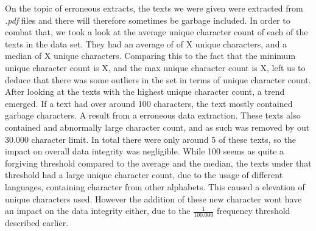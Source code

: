 On the topic of erroneous extracts, the texts we were given were extracted from
\textit{.pdf} files and there will therefore sometimes be garbage included.
In order to combat that, we took a look at the average unique character count
of each of the texts in the data set. They had an average of of X unique
characters, and a median of X unique characters. Comparing this to the fact that
the minimum unique character count is X, and the max unique character count is
X, left us to deduce that there was some outliers in the set in terms of unique
character count. After looking at the texts with the highest unique character
count, a trend emerged. If a text had over around 100 characters, the text
mostly contained garbage characters. A result from a erroneous data extraction.
These texts also contained and abnormally large character count, and as such
was removed by out 30.000 character limit. In total there were only around 5 of
these texts, so the impact on overall data integrity was negligible. While 100
seems as quite a forgiving threshold compared to the average and the median, the
texts under that threshold had a large unique character count, due to the usage
of different languages, containing character from other alphabets. This caused a
elevation of unique characters used. However the addition of these new character
wont have an impact on the data integrity either, due to the $\frac{1}{100.000}$
frequency threshold described earlier.

